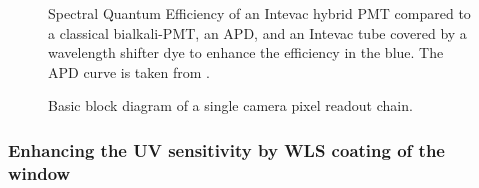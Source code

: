 \begin{figure}[htb]
\begin{center}
\caption{Spectral Quantum Efficiency of
an Intevac hybrid PMT compared to a classical bialkali-PMT, an APD, and an
Intevac tube covered by a wavelength shifter dye to enhance the efficiency
in the blue. The APD curve is taken from \cite{pansart:97}.}
\label{fig-spectral}
\end{center}
\end{figure}


\begin{figure}[htb]
\begin{center}
\caption{Basic block diagram of a
single camera pixel readout chain.}
\label{fig-block}
\end{center}
\end{figure} 
\vspace*{1cm}

\clearpage
\newpage
\subsubsection{Enhancing the UV sensitivity by WLS coating of the window}


